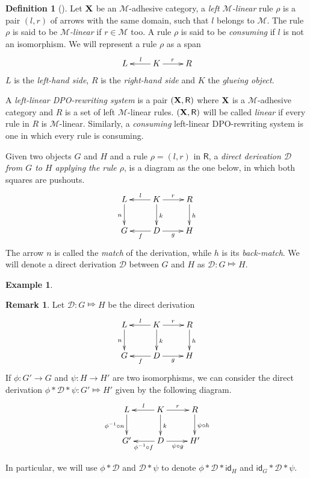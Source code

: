\documentclass[a4paper]{article}
\newcommand{\id}[1]{\mathsf{id}_{#1}}
\def\R{\mathsf{R}}
\def\X{\textbf {\textup{X}}}
\newcommand{\dder}[1]{\mathscr{#1}}
\theoremstyle{definition}
\newtheorem{definition}[theorem]{Definition}
\newtheorem{remark}[theorem]{Remark}
\newtheorem{example}[theorem]{Example}
\begin{document}
\begin{definition}[\cite{habel2012mathcal,heindel2009category}]
	Let $\X$ be an $\mathcal{M}$-adhesive category, a  \emph{left $\mathcal{M}$-linear} rule $\rho$ is a pair $(l,r)$ of arrows with the same domain, such that $l$ belongs to $\mathcal{M}$.  The rule $\rho$ is said to be \emph{$\mathcal{M}$-linear} if $r\in \mathcal{M}$ too. A rule $\rho$ is said to be \emph{consuming} if $l$ is not an isomorphism. We will represent a rule $\rho$ as a span 
	\[\xymatrix{L & K\ar[l]_{l} \ar[r]^{r} & R}\]
$L$ is the \emph{left-hand side}, $R$ is the \emph{right-hand side} and $K$ the \emph{glueing object}. 


A \emph{left-linear DPO-rewriting system} is a pair $(\X, \R)$ where $\X$ is a $\mathcal{M}$-adhesive category and $R$ is a set of left $\mathcal{M}$-linear rules. $(\X, \R)$ will be called \emph{linear} if every rule in $R$ is $\mathcal{M}$-linear. Similarly, a \emph{consuming} left-linear DPO-rewriting system is one in which every rule is consuming.

Given  two objects $G$ and $H$ and a rule $\rho=(l,r)$ in $\R$, a \emph{direct derivation $\mathscr{D}$ from $G$ to $H$ applying the rule $\rho$}, is a diagram as the one below, in which both squares are pushouts. 
	\[\xymatrix{L \ar[d]_{n}& K \ar[d]^{k}\ar[l]_{l} \ar[r]^{r} & R \ar[d]^{h}\\G & \ar[l]^{f} D \ar[r]_{g}& H}\]
	The arrow $n$ is called the \emph{match} of the derivation, while $h$ is its \emph{back-match}.
	We will denote a direct derivation $\dder{D}$ between $G$ and $H$ as $\dder{D}\colon G\Mapsto H$. 
\end{definition}

\begin{example}
\end{example}

\begin{remark}\label{exa:conc} Let  $\dder{D}\colon G\Mapsto H$ be the direct derivation 
		\[\xymatrix{L \ar[d]_{n}& K \ar[d]^{k}\ar[l]_{l} \ar[r]^{r} & R \ar[d]^{h}\\G & \ar[l]^{f} D \ar[r]_{g}& H}\]
	If $\phi\colon G'\to G$ and $\psi\colon H\to H'$ are two isomorphisms, 	we can consider the direct derivation	$\phi * \dder{D}*\psi \colon G'\Mapsto H'$ given by the following diagram.
	\[\xymatrix{L \ar[d]_{\phi^{-1} \circ n}& K \ar[d]^{k}\ar[l]_{l} \ar[r]^{r} & R \ar[d]^{\psi \circ h}\\G' & \ar[l]^{\phi^{-1} \circ f} D \ar[r]_{\psi \circ g}& H'}\]
	
	In particular, we will use $\phi*\dder{D}$ and $\dder{D}*\psi$  to denote $\phi*\dder{D}*\id{H}$ and $\id{G}*\dder{D}*\psi$.
\end{remark}
\end{document}
